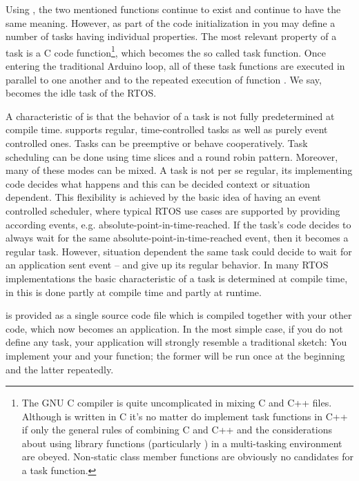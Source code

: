 Using \rtos{}, the two mentioned functions continue to exist and continue
to have the same meaning. However, as part of the code initialization in
 you may define a number of tasks having individual
properties. The most relevant property of a task is a C code
function\footnote{The GNU C compiler is quite uncomplicated in mixing C
and C++ files. Although \rtos{} is written in C it's no matter do
implement task functions in C++ if only the general rules of combining C
and C++ and the considerations about using library functions (particularly
) in a multi-tasking environment are obeyed. Non-static class
member functions are obviously no candidates for a task function.}, which
becomes the so called task function. Once entering the traditional Arduino
loop, all of these task functions are executed in parallel to one another
and to the repeated execution of function . We say,
 becomes the idle task of the RTOS.

A characteristic of \rtos{} is that the behavior of a task is not fully
predetermined at compile time. \rtos{} supports regular, time-controlled
tasks as well as purely event controlled ones. Tasks can be preemptive or
behave cooperatively. Task scheduling can be done using time slices and a
round robin pattern. Moreover, many of these modes can be mixed. A task is
not per se regular, its implementing code decides what happens and this
can be decided context or situation dependent. This flexibility is
achieved by the basic idea of having an event controlled scheduler, where
typical RTOS use cases are supported by providing according events, e.g.
absolute-point-in-time-reached. If the task's code decides to always wait
for the same absolute-point-in-time-reached event, then it becomes a
regular task. However, situation dependent the same task could decide to
wait for an application sent event -- and give up its regular behavior. In
many RTOS implementations the basic characteristic of a task is determined
at compile time, in \rtos{} this is done partly at compile time and partly
at runtime.

\rtos{} is provided as a single source code file which is compiled together
with your other code, which now becomes an \rtos{} application. In the most
simple case, if you do not define any task, your application will strongly
resemble a traditional sketch: You implement your  and your
 function; the former will be run once at the beginning and
the latter repeatedly.

